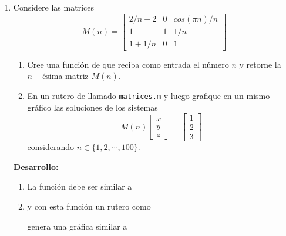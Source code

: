 \documentclass[letter,11pt]{article}
\begin{document}
\begin{enumerate}

\item Considere las matrices
$$
M(n)=%
\begin{bmatrix}
2/n+2   & 0 &cos(\pi n)/n\\
1   & 1 & 1/n\\
1+1/n & 0 & 1
\end{bmatrix}
$$

\begin{enumerate}
    \item {} Cree una funci\'on de \octave que reciba como entrada el n\'umero $n$ y retorne la $n-$\'esima matriz $M(n)$.
    \item {} En un rutero de \octave llamado \texttt{matrices.m} y luego grafique en un mismo gr\'afico las soluciones de los sistemas
    $$
    M(n)\begin{bmatrix}
    x\\ y \\ z
    \end{bmatrix}=\begin{bmatrix}
    1\\2\\3
    \end{bmatrix}
    $$
    considerando $n\in \{1,2,\cdots,100\}$.
\end{enumerate}
\textbf{Desarrollo:}
\begin{enumerate}
\item La funci\'on debe ser similar a

\hfill{}
\item y con esta funci\'on un rutero como

\hfill{}

genera una gr\'afica similar a
\end{enumerate}



\end{enumerate}
\end{document}

